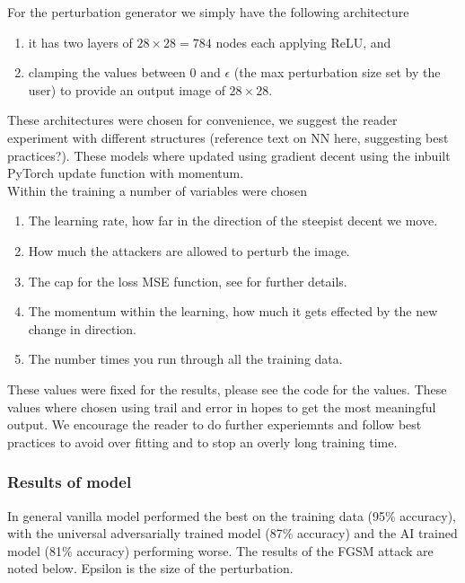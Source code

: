 For the perturbation generator we simply have the following architecture

\begin{enumerate}
	\item it has two layers of $28 \times 28 = 784$ nodes each applying ReLU, and
	\item clamping the values between 0 and $\epsilon$ (the max perturbation size set by the user) to provide an output image of $28 \times 28$.
\end{enumerate}

These architectures were chosen for convenience, we suggest the reader experiment with different structures (reference text on NN here, suggesting best practices?). These models where updated using gradient decent using the inbuilt PyTorch update function with momentum.\\

Within the training a number of variables were chosen

\begin{enumerate}
	\item The learning rate, how far in the direction of the steepist decent we move.
	\item How much the attackers are allowed to perturb the image.
	\item The cap for the loss MSE function, see \cite{shafahi_universal_2018} for further details.	
	\item The momentum within the learning, how much it gets effected by the new change in direction.
	\item The number times you run through all the training data.
\end{enumerate}

These values were fixed for the results, please see the code for the values. These values where chosen using trail and error in hopes to get the most meaningful output. We encourage the reader to do further experiemnts and follow best practices to avoid over fitting and to stop an overly long training time.

\subsubsection{Results of model}

In general vanilla model performed the best on the training data (95\% accuracy), with the universal adversarially trained model (87\% accuracy) and the AI trained model (81\% accuracy) performing worse. The results of the FGSM attack are noted below. Epsilon is the size of the perturbation.

